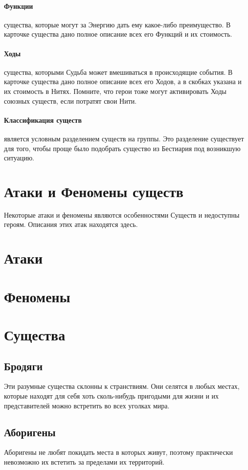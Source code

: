 \paragraph{Функции} существа, которые могут за Энергию дать ему какое-либо преимущество. В карточке существа дано полное описание всех его Функций и их стоимость.
\paragraph{Ходы} существа, которыми Судьба может вмешиваться в происходящие события. В карточке существа дано полное описание всех его Ходов, а в скобках указана и их стоимость в Нитях. Помните, что герои тоже могут активировать Ходы союзных существ, если потратят свои Нити.
\paragraph{Классификация существ} является условным разделением существ на группы. Это разделение существует для того, чтобы проще было подобрать существо из Бестиария под возникшую ситуацию.

\section{Атаки и Феномены существ}
Некоторые атаки и феномены являются особенностями Существ и недоступны героям. Описания этих атак находятся здесь.
\section{Атаки}
\section{Феномены}

\newpage \section{Существа}
\subsection{Бродяги}
Эти разумные существа склонны к странствиям. Они селятся в любых местах, которые находят для себя хоть сколь-нибудь пригодыми для жизни и их представителей можно встретить во всех уголках мира.

\subsection{Аборигены}
Аборигены не любят покидать места в которых живут, поэтому практически невозможно их встетить за пределами их территорий.

